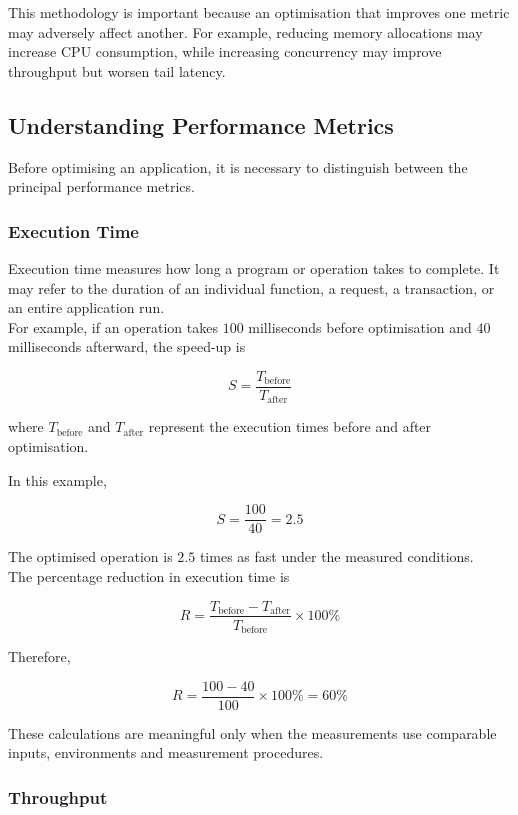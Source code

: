 This methodology is important because an optimisation that improves one metric may adversely affect another. For example, reducing memory allocations may increase CPU consumption, while increasing concurrency may improve throughput but worsen tail latency.

\subsection{Understanding Performance Metrics}

Before optimising an application, it is necessary to distinguish between the principal performance metrics.

\subsubsection{Execution Time}

Execution time measures how long a program or operation takes to complete. It may refer to the duration of an individual function, a request, a transaction, or an entire application run.\\

For example, if an operation takes \(100\) milliseconds before optimisation and \(40\) milliseconds afterward, the speed-up is

\[
S = \frac{T_{\mathrm{before}}}{T_{\mathrm{after}}}
\]

where \(T_{\mathrm{before}}\) and \(T_{\mathrm{after}}\) represent the execution times before and after optimisation.

In this example,

\[
S = \frac{100}{40} = 2.5
\]

The optimised operation is \(2.5\) times as fast under the measured conditions.\\

The percentage reduction in execution time is

\[
R =
\frac{T_{\mathrm{before}}-T_{\mathrm{after}}}
     {T_{\mathrm{before}}}
\times 100\%
\]

Therefore,

\[
R = \frac{100-40}{100}\times 100\% = 60\%
\]

These calculations are meaningful only when the measurements use comparable inputs, environments and measurement procedures.

\subsubsection{Throughput}

